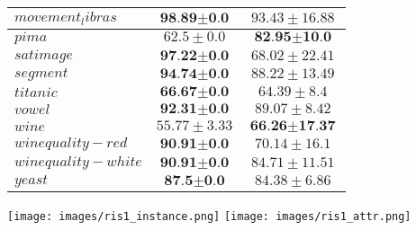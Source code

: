 \documentclass[a4paper, 12pt]{article}
\begin{document}
\begin{table}[h!]
\begin{center}
\begin{tabular}{l|c|c}
        \hline
        $movement_libras$ & $\textbf{98.89} \pm \textbf{0.0}$  & $93.43 \pm 16.88$ \\
        \hline
        $pima$ & $62.5 \pm 0.0$  & $\textbf{82.95} \pm \textbf{10.0}$ \\
        \hline
        $satimage$ & $\textbf{97.22} \pm \textbf{0.0}$  & $68.02 \pm 22.41$ \\
        \hline
        $segment$ & $\textbf{94.74} \pm \textbf{0.0}$  & $88.22 \pm 13.49$ \\
        \hline
        $titanic$ & $\textbf{66.67} \pm \textbf{0.0}$  & $64.39 \pm 8.4$ \\
        \hline
        $vowel$ & $\textbf{92.31} \pm \textbf{0.0}$  & $89.07 \pm 8.42$ \\
        \hline
        $wine$ & $55.77 \pm 3.33$  & $\textbf{66.26} \pm \textbf{17.37}$ \\
        \hline
        $winequality-red$ & $\textbf{90.91} \pm \textbf{0.0}$  & $70.14 \pm 16.1$ \\
        \hline
        $winequality-white$ & $\textbf{90.91} \pm \textbf{0.0}$  & $84.71 \pm 11.51$ \\
        \hline
        $yeast$ & $\textbf{87.5} \pm \textbf{0.0}$  & $84.38 \pm 6.86$ \\
    \end{tabular}
  \end{center}
\end{table}
\newpage

\texttt{[image: images/ris1\_instance.png]}
\texttt{[image: images/ris1\_attr.png]}
\end{document}
